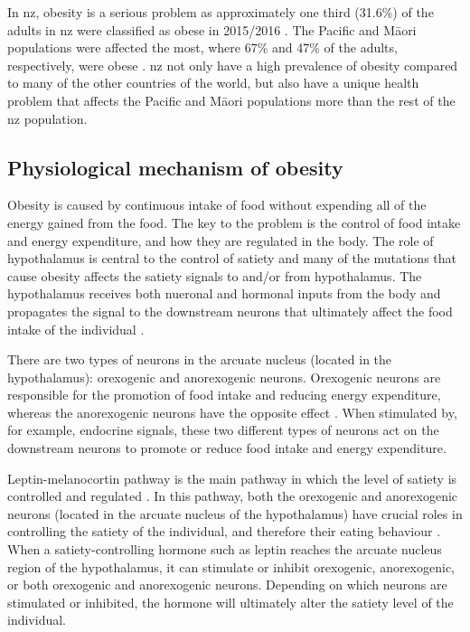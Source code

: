 In \gls{nz}, obesity is a serious problem as approximately one third (31.6\%) of the adults in \gls{nz} were classified as obese in 2015/2016 \citep{Health2016}.
The Pacific and M\=aori populations were affected the most, where 67\% and 47\% of the adults, respectively, were obese \citep{Health2016}.
\gls{nz} not only have a high prevalence of obesity compared to many of the other countries of the world, but also have a unique health problem that affects the Pacific and M\=aori populations more than the rest of the \gls{nz} population.


\subsection{Physiological mechanism of obesity}
\label{sub:physiological_mechanism_of_obesity}

Obesity is caused by continuous intake of food without expending all of the energy gained from the food.
The key to the problem is the control of food intake and energy expenditure, and how they are regulated in the body.
The role of hypothalamus is central to the control of satiety and many of the mutations that cause obesity affects the satiety signals to and/or from hypothalamus.
The hypothalamus receives both nueronal and hormonal inputs from the body and propagates the signal to the downstream neurons that ultimately affect the food intake of the individual \citep{Bell2005, Spiegelman2001}.

There are two types of neurons in the arcuate nucleus (located in the hypothalamus): orexogenic and anorexogenic neurons.
Orexogenic neurons are responsible for the promotion of food intake and reducing energy expenditure, whereas the anorexogenic neurons have the opposite effect \citep{Barsh2002}.
When stimulated by, for example, endocrine signals, these two different types of neurons act on the downstream neurons to promote or reduce food intake and energy expenditure.

Leptin-melanocortin pathway is the main pathway in which the level of satiety is controlled and regulated \citep{Spiegelman2001}.
In this pathway, both the orexogenic and anorexogenic neurons (located in the arcuate nucleus of the hypothalamus) have crucial roles in controlling the satiety of the individual, and therefore their eating behaviour \citep{Barsh2002,Bell2005}.
When a satiety-controlling hormone such as leptin reaches the arcuate nucleus region of the hypothalamus, it can stimulate or inhibit orexogenic, anorexogenic, or both orexogenic and anorexogenic neurons.
Depending on which neurons are stimulated or inhibited, the hormone will ultimately alter the satiety level of the individual.

